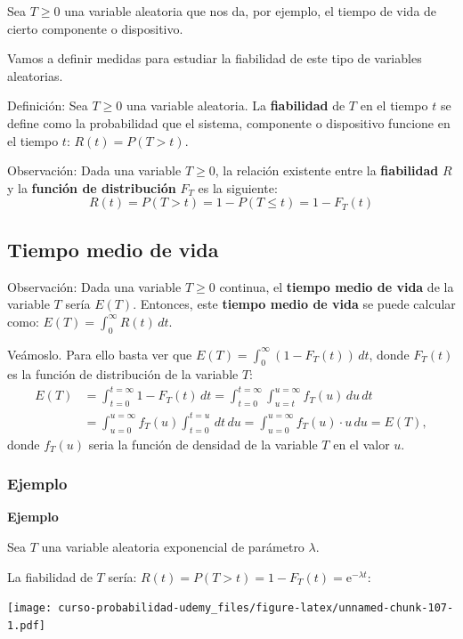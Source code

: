 \documentclass[]{book}
\begin{document}
Sea \(T\geq 0\) una variable aleatoria que nos da, por ejemplo, el tiempo de vida de cierto componente o dispositivo.

Vamos a definir medidas para estudiar la fiabilidad de este tipo de variables aleatorias.

Definición:
Sea \(T\geq 0\) una variable aleatoria. La \textbf{fiabilidad} de \(T\) en el tiempo \(t\) se define como la probabilidad que el sistema, componente o dispositivo funcione en el tiempo \(t\): \(R(t)=P(T>t)\).

Observación:
Dada una variable \(T\geq 0\), la relación existente entre la \textbf{fiabilidad} \(R\) y la \textbf{función de distribución} \(F_T\) es la siguiente:
\[
R(t)=P(T>t)=1-P(T\leq t)=1-F_T (t)
\]

\hypertarget{tiempo-medio-de-vida}{%
\subsection{Tiempo medio de vida}\label{tiempo-medio-de-vida}}

Observación:
Dada una variable \(T\geq 0\) continua, el \textbf{tiempo medio de vida} de la variable \(T\) sería \(E(T)\). Entonces, este \textbf{tiempo medio de vida} se puede calcular como:
\(E(T)=\int_0^\infty R(t)\, dt.\)

Veámoslo. Para ello basta ver que \(E(T)=\int_0^\infty (1-F_T(t))\, dt\), donde \(F_T(t)\) es la función de distribución de la variable \(T\):
\[
\begin{array}{rl}
E(T) & =\int_{t=0}^{t=\infty} 1-F_T(t)\, dt=\int_{t=0}^{t=\infty}\int_{u=t}^{u=\infty} f_T(u)\,du\,dt \\ & =\int_{u=0}^{u=\infty} f_T(u)\int_{t=0}^{t=u} \, dt\, du =\int_{u=0}^{u=\infty} f_T(u)\cdot u\, du = E(T),
\end{array}
\]
donde \(f_T(u)\) seria la función de densidad de la variable \(T\) en el valor \(u\).

\hypertarget{ejemplo-1}{%
\subsubsection{Ejemplo}\label{ejemplo-1}}

\textbf{Ejemplo}

Sea \(T\) una variable aleatoria exponencial de parámetro \(\lambda\).

La fiabilidad de \(T\) sería: \(R(t)=P(T>t)=1-F_T(t)=\mathrm{e}^{-\lambda t}\):

\texttt{[image: curso-probabilidad-udemy\_files/figure-latex/unnamed-chunk-107-1.pdf]}
\end{document}
